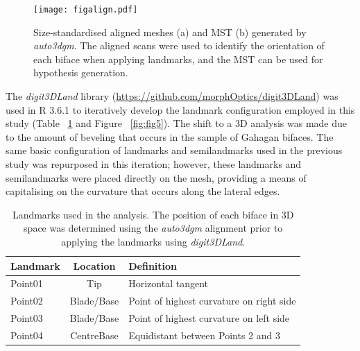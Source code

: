 \documentclass[review]{elsarticle}
\begin{document}
\begin{figure}[ht]\centering
\texttt{[image: figalign.pdf]}
\caption{Size-standardised aligned meshes (a) and MST (b) generated by \textit{auto3dgm}. The aligned scans were used to identify the orientation of each biface when applying landmarks, and the MST can be used for hypothesis generation.}
\label{fig:fig4}
\end{figure}

The \textit{digit3DLand} library (\href{https://github.com/morphOptics/digit3DLand}{https://github.com/morphOptics/digit3DLand}) was used in R 3.6.1 \citep{R} to iteratively develop the landmark configuration employed in this study (Table ~\ref{tab:Tbl1} and Figure ~\ref{fig:fig5}). The shift to a 3D analysis was made due to the amount of beveling that occurs in the sample of Gahagan bifaces. The same basic configuration of landmarks and semilandmarks used in the previous study \citep[Figure 3]{RN11783} was repurposed in this iteration; however, these landmarks and semilandmarks were placed directly on the mesh, providing a means of capitalising on the curvature that occurs along the lateral edges.

\begin{table}[tbh]\centering
\footnotesize
\caption{Landmarks used in the analysis. The position of each biface in 3D space was determined using the \textit{auto3dgm} alignment prior to applying the landmarks using \textit{digit3DLand}.}
\centering
\begin{tabular}{lcp{7.5cm}}
\toprule
Landmark & Location & Definition\\
\midrule
Point01 & Tip & Horizontal tangent\\
Point02 & Blade/Base & Point of highest curvature on right side\\
Point03 & Blade/Base & Point of highest curvature on left side\\
Point04 & CentreBase & Equidistant between Points 2 and 3\\
\bottomrule
\end{tabular}
\label{tab:Tbl1}
\end{table}
\end{document}
